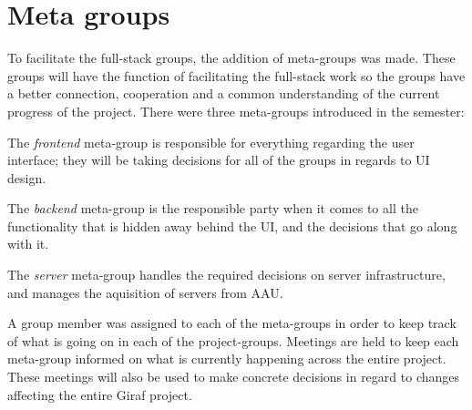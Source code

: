 \section{Meta groups}\label{SUBSEC:MetaGroups}
To facilitate the full-stack groups, the addition of meta-groups was made.
These groups will have the function of facilitating the full-stack work so the groups have a better connection, cooperation and a common understanding of the current progress of the project.
There were three meta-groups introduced in the semester:

The \textit{frontend} meta-group is responsible for everything regarding the user interface; they will be taking decisions for all of the groups in regards to UI design.

The \textit{backend} meta-group is the responsible party when it comes to all the functionality that is hidden away behind the UI, and the decisions that go along with it.

The \textit{server} meta-group handles the required decisions on server infrastructure, and manages the aquisition of servers from AAU.

A group member was assigned to each of the meta-groups in order to keep track of what is going on in each of the project-groups. Meetings are held to keep each meta-group informed on what is currently happening across the entire project. These meetings will also be used to make concrete decisions in regard to changes affecting the entire Giraf project.
